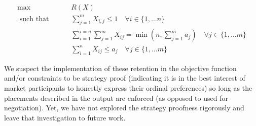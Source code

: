 \begin{align*}
\max \qquad & R(X) \\
\text{ such that } \qquad & \sum_{j=1}^m X_{i,j} \leq 1 \quad  \forall i \in \{1, \dots n\} \\
& \sum_{i = 1}^{i=n} \sum_{j = 1}^{m}X_{ij} = \min \left(n,\sum_{j = 1}^{m}a_j \right) \quad  \forall j \in \{1, \dots m\}  \\
& \sum_{i=1}^n X_{ij} \leq a_j \quad  \forall j \in \{1, \dots m\}
\end{align*} 

We suspect the implementation of these retention in the objective function and/or constraints to be strategy proof (indicating it is in the best interest of market participants to honestly express their ordinal preferences) so long as the placements described in the output are enforced (as opposed to used for negotiation). Yet, we have not explored the strategy proofness rigorously and leave that investigation to future work.
